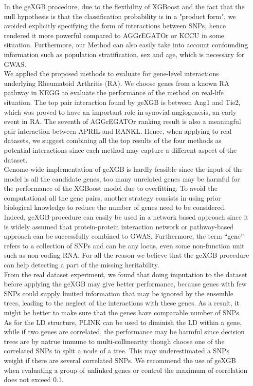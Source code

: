 \documentclass[11pt]{article}
\theoremstyle{plain}
\theoremstyle{definition}
\theoremstyle{remark}
\begin{document}
\noindent In the geXGB procedure, due to the flexibility of XGBoost and the fact that the null hypothesis is that the classification probability is in a "product form", we avoided explicitly specifying the form of interactions between SNPs, hence rendered it more powerful compared to AGGrEGATOr or KCCU in some situation. Furthermore, our Method can also easily take into account confounding information such as population stratification, sex and age, which is necessary for GWAS.\\

\noindent We applied the proposed methods to evaluate for gene-level interactions underlying Rheumatoid Arthritis (RA). We choose genes from a known RA pathway in KEGG to evaluate the performance of the method on real-life situation. The top pair interaction found by geXGB is between Ang1 and Tie2, which was proved to have an important role in synovial angiogenesis, an early event in RA. The seventh of AGGrEGATOr ranking result is also a meaningful pair interaction between APRIL and RANKL. Hence, when applying to real datasets, we suggest combining all the top results of the four methods as potential interactions since each method may capture a different aspect of the dataset.\\

\noindent Genome-wide implementation of geXGB is hardly feasible since the input of the model is all the candidate genes, too many unrelated genes may be harmful for the performance of the XGBoost model due to overfitting. To avoid the computational all the gene pairs, another strategy consists in using prior biological knowledge to reduce the number of genes need to be considered. Indeed, geXGB procedure can easily be used in a network based approach since it is widely assumed that protein-protein interaction network or pathway-based approach can be successfully combined to GWAS. Furthermore, the term ``gene'' refers to a collection of SNPs and can be any locus, even some non-function unit such as non-coding RNA. For all the reason we believe that the geXGB procedure can help detecting a part of the missing heritability. \\

From the real dataset experiment, we found that doing imputation to the dataset before applying the geXGB may give better performance, because genes with few SNPs could supply limited information that may be ignored by the ensemble trees, leading to the neglect of the interactions with these genes. As a result, it might be better to make sure that the genes have comparable number of SNPs. As for the LD structure, PLINK can be used to diminish the LD within a gene, while if two genes are correlated, the performance may be harmful since decision trees are by natrue immune to multi-collinearity though choose one of the correlated SNPs to split a node of a tree. This may underestimated a SNPs weight if there are several correlated SNPs. We recommend the use of geXGB when evaluating a group of unlinked genes or control the maximum of correlation does not exceed 0.1.\\
\end{document}
